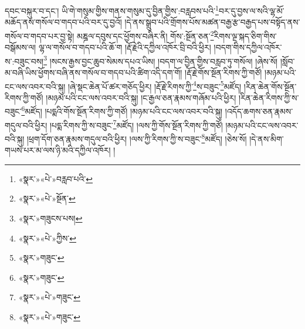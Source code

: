 དབང་བསྐུར་བ་དང་། ཡི་གེ་གསུམ་གྱིས་གནས་གསུམ་དུ་བྱིན་གྱིས་:བརླབས་པའི་\footnote{«སྣར་»«པེ་»བརླབ་པའི་}བར་དུ་བྱས་ལ་སའི་ལྷ་མོ་མཆོད་ནས་གསོལ་བ་གདབ་པའི་བར་དུ་བྱའོ། །དེ་ནས་སྒྲུབ་པའི་གྲོགས་པོས་མཚན་བརྒྱ་རྩ་བརྒྱད་པས་བསྟོད་ནས་གསོལ་བ་གདབ་པར་བྱ་སྟེ། མཎྜལ་དབུས་དང་ཕྱོགས་བཞིར་ནི། གོས་:སྔོན་ཅན་\footnote{«སྣར་»«པེ་»སྔོན་}རིགས་ལྔ་སྐད་ཅིག་གིས་བསྒོམས་ལ། ལྷ་ལ་གསོལ་བ་གདབ་པའི་ཆོ་ག །རྡོ་རྗེའི་དཀྱིལ་འཁོར་བྲི་བའི་ཕྱིར། །བདག་གིས་དཀྱིལ་འཁོར་ས་:བཟུང་བས།\footnote{«སྣར་»གཟུངས་པས།} །སངས་རྒྱས་བྱང་ཆུབ་སེམས་དཔའ་ཡིས། །བདག་ལ་བྱིན་གྱིས་བརླབ་ཏུ་གསོལ། །ཞེས་སོ། །སློབ་མ་བཞི་ཡིས་ཕྱོགས་བཞི་ནས་གསོལ་བ་གདབ་པའི་ཚིག་འདི་དག་གོ། །རྡོ་རྗེ་གོས་སྔོན་རིགས་ཀྱི་གཙོ། །མཉམ་པའི་ངང་ལས་འབར་བའི་སྐུ། །ཞེ་སྡང་ཆེན་པོ་ཚར་གཅོད་ཕྱིར། །རྡོ་རྗེ་རིགས་ཀྱི་\footnote{«སྣར་»«པེ་»ཀྱིས་}ས་བཟུང་\footnote{«སྣར་»གཟུང་}མཛོད། །རིན་ཆེན་གོས་སྔོན་རིགས་ཀྱི་གཙོ། །མཉམ་པའི་ངང་ལས་འབར་བའི་སྐུ། །ང་རྒྱལ་ཅན་རྣམས་གཞོམ་པའི་ཕྱིར། །རིན་ཆེན་རིགས་ཀྱི་ས་བཟུང་\footnote{«སྣར་»གཟུང་}མཛོད། །པདྨའི་གོས་སྔོན་རིགས་ཀྱི་གཙོ། །མཉམ་པའི་ངང་ལས་འབར་བའི་སྐུ། །འདོད་ཆགས་ཅན་རྣམས་གདུལ་བའི་ཕྱིར། །པདྨ་རིགས་ཀྱི་ས་བཟུང་\footnote{«སྣར་»«པེ་»གཟུང་}མཛོད། །ལས་ཀྱི་གོས་སྔོན་རིགས་ཀྱི་གཙོ། །མཉམ་པའི་ངང་ལས་འབར་བའི་སྐུ། །ཕྲག་དོག་ཅན་རྣམས་གདུལ་བའི་ཕྱིར། །ལས་ཀྱི་རིགས་ཀྱི་ས་བཟུང་\footnote{«སྣར་»«པེ་»གཟུང་}མཛོད། །ཅེས་སོ། །དེ་ནས་མིག་གཡས་པར་མ་ལས་ཉི་མའི་དཀྱིལ་འཁོར། །
